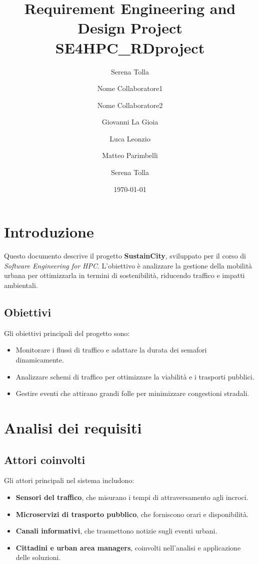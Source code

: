 \documentclass[a4paper,12pt]{article}
\author[1]{Serena Tolla}
\author[2]{Nome Collaboratore1}
\author[3]{Nome Collaboratore2}
\affil[1,2,3]{Politecnico di Milano}
\title{Requirement Engineering and Design Project \\ SE4HPC_RDproject}
\author[1]{Giovanni La Gioia}
\author[2]{Luca Leonzio}
\author[3]{Matteo Parimbelli}
\author[4]{Serena Tolla}
\affil[1,2,3]{Politecnico di Milano}
\date{\today}
\begin{document}
\maketitle
\tableofcontents
\newpage

\section{Introduzione}
Questo documento descrive il progetto \textbf{SustainCity}, sviluppato per il corso di \textit{Software Engineering for HPC}. 
L'obiettivo è analizzare la gestione della mobilità urbana per ottimizzarla in termini di sostenibilità, riducendo traffico e impatti ambientali.

\subsection{Obiettivi}
Gli obiettivi principali del progetto sono:
\begin{itemize}
    \item Monitorare i flussi di traffico e adattare la durata dei semafori dinamicamente.
    \item Analizzare schemi di traffico per ottimizzare la viabilità e i trasporti pubblici.
    \item Gestire eventi che attirano grandi folle per minimizzare congestioni stradali.
\end{itemize}

\newpage

\section{Analisi dei requisiti}
\subsection{Attori coinvolti}
Gli attori principali nel sistema includono:
\begin{itemize}
    \item \textbf{Sensori del traffico}, che misurano i tempi di attraversamento agli incroci.
    \item \textbf{Microservizi di trasporto pubblico}, che forniscono orari e disponibilità.
    \item \textbf{Canali informativi}, che trasmettono notizie sugli eventi urbani.
    \item \textbf{Cittadini e urban area managers}, coinvolti nell'analisi e applicazione delle soluzioni.
\end{itemize}
\end{document}
